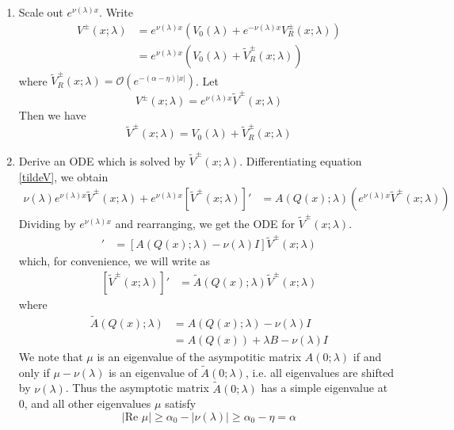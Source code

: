 \documentclass[thesis.tex]{subfiles}
\begin{document}
\begin{enumerate}

\item Scale out $e^{\nu(\lambda)x}$. Write 
\begin{align*}
V^\pm(x; \lambda) &= e^{\nu(\lambda)x} (V_0(\lambda) + e^{-\nu(\lambda)x} V_R^\pm(x; \lambda)) \\
&= e^{\nu(\lambda)x}(V_0(\lambda) + \tilde{V}_R^\pm(x; \lambda))
\end{align*}
where $\tilde{V}_R^\pm(x; \lambda) = \mathcal{O}(e^{-(\alpha - \eta) |x|})$. Let
\begin{equation*}
V^\pm(x; \lambda) = e^{\nu(\lambda)x}\tilde{V}^\pm(x; \lambda)
\end{equation*}
Then we have
\begin{equation}\label{tildeV}
\tilde{V}^\pm(x; \lambda) = V_0(\lambda) + \tilde{V}_R^\pm(x; \lambda)
\end{equation}

\item Derive an ODE which is solved by $\tilde{V}^\pm(x; \lambda)$. Differentiating equation \eqref{tildeV}, we obtain
\begin{align*}
\nu(\lambda) e^{\nu(\lambda)x}\tilde{V}^\pm(x; \lambda) 
+ e^{\nu(\lambda)x}[\tilde{V}^\pm(x; \lambda)]'
&= A(Q(x); \lambda) (e^{\nu(\lambda)x}\tilde{V}^\pm(x; \lambda))
\end{align*}
Dividing by $e^{\nu(\lambda)x}$ and rearranging, we get the ODE for $\tilde{V}^\pm(x; \lambda)$.
\begin{align*}
[\tilde{V}^\pm(x; \lambda)]'
&= [A(Q(x); \lambda) - \nu(\lambda)I]\tilde{V}^\pm(x; \lambda)
\end{align*}
which, for convenience, we will write as
\begin{align}\label{tildeVeq}
[\tilde{V}^\pm(x; \lambda)]'
&= \tilde{A}(Q(x); \lambda)\tilde{V}^\pm(x; \lambda)
\end{align}
where 
\begin{align*}
\tilde{A}(Q(x); \lambda) &= A(Q(x); \lambda) - \nu(\lambda)I \\
&= A(Q(x)) + \lambda B - \nu(\lambda)I
\end{align*}
We note that $\mu$ is an eigenvalue of the asympotitic matrix $A(0; \lambda)$ if and only if $\mu - \nu(\lambda)$ is an eigenvalue of $\tilde{A}(0; \lambda)$, i.e. all eigenvalues are shifted by $\nu(\lambda)$. Thus the asymptotic matrix $\tilde{A}(0; \lambda)$ has a simple eigenvalue at 0, and all other eigenvalues $\mu$ satisfy
\[
|\text{Re }\mu| \geq \alpha_0 - |\nu(\lambda)| \geq \alpha_0 - \eta = \alpha
\]


\end{enumerate}
\end{document}
